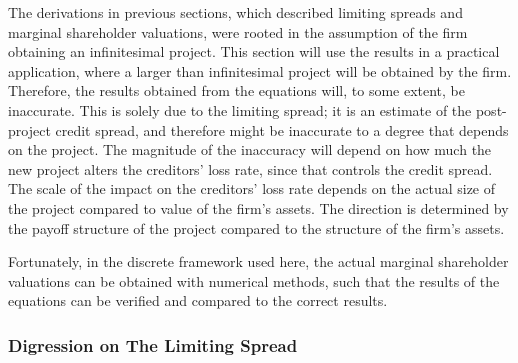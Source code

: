 \documentclass[main.tex]{subfiles}
\begin{document}
    The derivations in previous sections, 
    which described limiting spreads and marginal shareholder valuations, 
    were rooted in the assumption of the firm obtaining an infinitesimal project.
    This section will use the results in a practical application,
    where a larger than infinitesimal project will be obtained by the firm.
    Therefore, the results obtained from the equations will, to some extent, be inaccurate.
    This is solely due to the limiting spread;
    it is an estimate of the post-project credit spread,
    and therefore might be inaccurate to a degree that depends on the project.
    The magnitude of the inaccuracy will depend on how much the new project alters
    the creditors' loss rate, since that controls the credit spread.
    The scale of the impact on the creditors' loss rate 
    depends on the actual size of the project compared to value of the firm's assets.
    The direction is determined by the payoff structure of the project
    compared to the structure of the firm's assets.

    Fortunately, in the discrete framework used here, 
    the actual marginal shareholder valuations can be obtained with numerical methods,
    such that the results of the equations can be verified and compared to the correct results.

    \subsubsection*{Digression on The Limiting Spread}
\end{document}
